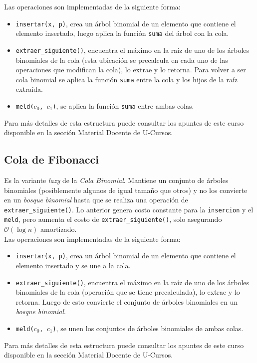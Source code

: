 \documentclass[dcc,uchile]{fcfmcourse}
\begin{document}
Las operaciones son implementadas de la siguiente forma:
\begin{itemize}
    \item \texttt{insertar(x, p)}, crea un árbol binomial de un elemento que contiene el elemento insertado, luego aplica la función \texttt{suma} del árbol con la cola.
    \item \texttt{extraer\_siguiente()}, encuentra el máximo en la raíz de uno de los árboles binomiales de la cola (esta ubicación se precalcula en cada uno de las operaciones que modifican la cola), lo extrae y lo retorna. Para volver a ser cola binomial se aplica la función \texttt{suma} entre la cola y los hijos de la raíz extraída.
    \item \texttt{meld($c_{0}$, $c_{1}$)}, se aplica la función \texttt{suma} entre ambas colas.
\end{itemize}
Para más detalles de esta estructura puede consultar los apuntes de este curso disponible en la sección Material Docente de U-Cursos.

\subsection{Cola de Fibonacci}
Es la variante \textit{lazy} de la \textit{Cola Binomial}. Mantiene un conjunto de árboles binomiales (posiblemente algunos de igual tamaño que otros) y no los convierte en un \textit{bosque binomial} hasta que se realiza una operación de \texttt{extraer\_siguiente()}. Lo anterior genera costo constante para la \texttt{insercion} y el \texttt{meld}, pero aumenta el costo de \texttt{extraer\_siguiente()}, solo asegurando $\mathcal{O}(\log{n})$ amortizado.\\

Las operaciones son implementadas de la siguiente forma:
\begin{itemize}
    \item \texttt{insertar(x, p)}, crea un árbol binomial de un elemento que contiene el elemento insertado y se une a la cola.
    \item \texttt{extraer\_siguiente()}, encuentra el máximo en la raíz de uno de los árboles binomiales de la cola (operación que se tiene precalculada), lo extrae y lo retorna. Luego de esto convierte el conjunto de árboles binomiales en un \textit{bosque binomial}.
    \item \texttt{meld($c_{0}$, $c_{1}$)}, se unen los conjuntos de árboles binomiales de ambas colas.
\end{itemize}
Para más detalles de esta estructura puede consultar los apuntes de este curso disponible en la sección Material Docente de U-Cursos.
\end{document}
